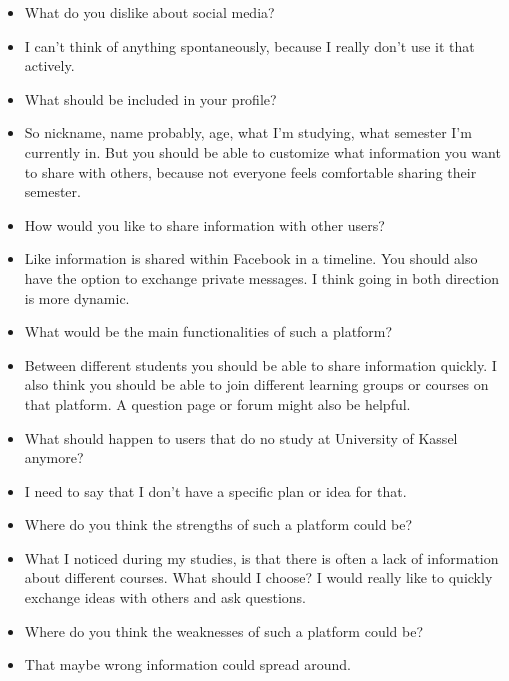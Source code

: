 {\begin{itemize}[]
    \item {} What do you dislike about social media?
    \item {} I can't think of anything spontaneously, because I really don't use it that actively.
    \item {} What should be included in your profile?
    \item {} So nickname, name probably, age, what I'm studying, what semester I'm currently in. But you should be able to customize what information you want to share with others, because not everyone feels comfortable sharing their semester.
    \item {} How would you like to share information with other users?
    \item {} Like information is shared within Facebook in a timeline. You should also have the option to exchange private messages. I think going in both direction is more dynamic.
    \item {} What would be the main functionalities of such a platform?
    \item {} Between different students you should be able to share information quickly. I also think you should be able to join different learning groups or courses on that platform. A question page or forum might also be helpful.
    \item {} What should happen to users that do no study at University of Kassel anymore?
    \item {} I need to say that I don't have a specific plan or idea for that.
    \item {} Where do you think the strengths of such a platform could be?
    \item {} What I noticed during my studies, is that there is often a lack of information about different courses. What should I choose? I would really like to quickly exchange ideas with others and ask questions.
    \item {} Where do you think the weaknesses of such a platform could be?
    \item {} That maybe wrong information could spread around.
\end{itemize}}
\nolinenumbers
